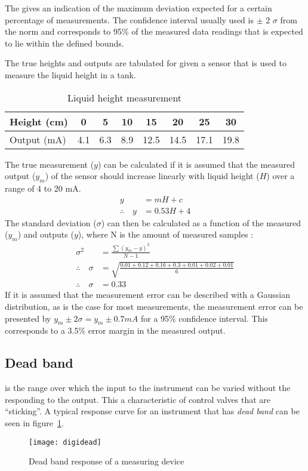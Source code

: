 The  gives an indication of the maximum deviation expected for a certain 						percentage of measurements. The confidence interval usually used is $\pm$ 2 $\sigma$ from the norm and 					corresponds to 95\% of the measured data readings that is expected to lie within the defined bounds.      
\begin{example}
	The true heights and outputs are tabulated for given a sensor that is used to measure the liquid 								height in a tank. 
	\begin{table}[htbp]
		\centering
  	\caption{Liquid height measurement}
		\begin{tabular}{l c c c c c c c}
			\addlinespace[1em]
			\toprule[1pt]
				Height (cm) & 0 & 5 & 10 & 15 & 20 & 25 & 30 \\
    	\midrule[0.5pt]
    		Output (mA) & 4.1 & 6.3 & 8.9 & 12.5 & 14.5 & 17.1 & 19.8 \\
    	\bottomrule[1pt]
  	\end{tabular}
	\end{table}
The true measurement ($y$) can be calculated if it is assumed that the measured output ($y_m$) of the 					sensor should increase linearly with liquid height ($H$) over a range of 4 to 20 mA.
\begin{align}
	y &=  mH + c \nonumber\\
\therefore \quad y &= 0.53H + 4 \nonumber
\end{align}
The standard deviation ($\sigma$) can then be calculated as a function of the measured ($y_m$) and outputs ($y$), where N is the amount of measured samples \citep[25]{Johnson94}:
\begin{align}
	\sigma^2                  &= \frac{\sum{(y_{m} - y)^2}}{N-1} \nonumber\\
	\therefore \quad \sigma   &= \sqrt{\frac{0.01 + 0.12 + 0.16 + 0.3 + 0.01 + 0.02 + 0.01}{6}} \nonumber\\
	\therefore \quad \sigma   &= 0.33 \nonumber
\end{align}
If it is assumed that the measurement error can be described with a Gaussian distribution, as is the case 			for most measurements, the measurement error can be presented by $y_{m}\pm 2\sigma = y_{m}\pm 0.7 mA$ for 			a 95\% confidence interval. This corresponds to a  3.5\% error margin in the measured output. 
\end{example}

\subsection{Dead band}		
 is the range over which the input to the instrument can be varied without the responding to the output. This a characteristic of control valves that are ``sticking''. A typical response curve for an instrument that has \emph{dead band} can be seen in figure~\ref{fig:digi:dead}.
\begin{figure}[htbp]
	\centering
	\texttt{[image: digidead]}
	\caption{Dead band  response of a measuring device}
	\label{fig:digi:dead}
\end{figure}        

